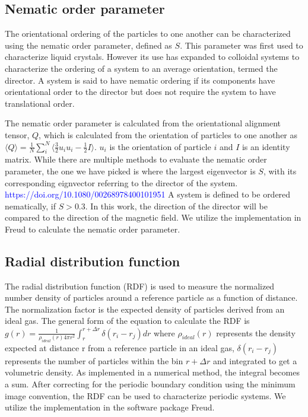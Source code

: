 \subsection{Nematic order parameter}
\label{section:nematic_order_parameter}

The orientational ordering of the particles to one another can be characterized using the nematic order parameter, 
defined as $S$. This parameter was first used to characterize liquid crystals. However its use has expanded to colloidal 
systems to characterize the ordering of a system to an average orientation, termed the director. A system is said to have 
nematic ordering if its components have orientational order to the director but does not require the system to have 
translational order.

The nematic order parameter is calculated from the orientational alignment tensor, $Q$, which is calculated from the 
orientation of particles to one another as 
$\langle Q \rangle = \frac{1}{N} \sum_{i}^{N} \langle \frac{3}{2}u_i u_i - \frac{1}{2}I \rangle$. $u_i$ is the 
orientation of particle $i$ and $I$ is an identity matrix. \cite{veerman_phase_1992} While there are multiple 
methods to evaluate the nematic order parameter, the one we have picked is where the largest eigenvector is $S$, 
with its corresponding eignvector referring to the director of the system. \cite{veerman_phase_1992} 
\textcolor{blue}{https://doi.org/10.1080/00268978400101951} A system is defined to be ordered nematically, 
if $S > 0.3$. In this work, the direction of the director will be compared to the direction of the magnetic 
field. We utilize the implementation in Freud to calculate the nematic order parameter.

\subsection{Radial distribution function}
\label{section:radial_distribution}

The radial distribution function (RDF) is used to measure the normalized number density of particles around a 
reference particle as a function of distance. The normalization factor is the expected density of particles derived 
from an ideal gas. The general form of the equation to calculate the RDF is 
$g(r) = \frac{1}{\rho_{ideal}(r) 4\pi r^2} \int_{r}^{r+\Delta r} \delta(r_{i} - r_{j}) dr$ where $\rho_{ideal}(r)$ 
represents the density expected at distance r from a reference particle in an ideal gas, $\delta(r_{i} - r_{j})$ 
represents the number of particles within the bin $r + \Delta r$ and integrated to get a volumetric density. 
As implemented in a numerical method, the integral becomes a sum. After correcting for the periodic boundary 
condition using the minimum image convention, the RDF can be used to characterize periodic systems. We utilize 
the implementation in the software package Freud. \cite{ramasubramani_freud_2020}

